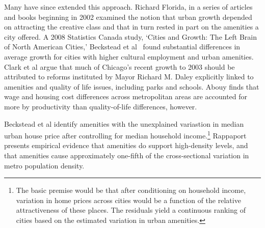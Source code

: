 Many have since extended this approach. Richard Florida, in a series of articles and books beginning in 2002 \cite{floridaCreativeClassEconomic2014, floridaEconomicGeographyTalent2002, floridaCompetingAgeTalent2005} examined the notion that urban growth depended on attracting the creative class and that in turn rested in part on the amenities a city offered. A 2008  Statistics Canada study, `Cities and Growth: The Left Brain of North American Cities,' Beckstead et al \ found substantial differences in average growth for cities with higher cultural employment and urban amenities.  Clark et al \cite{clarkAmenitiesDriveUrban2002} argue that much of Chicago's recent growth to 2003  should be attributed to reforms instituted by Mayor Richard M.  Daley explicitly linked to amenities and quality of life issues, including parks and schools. Abouy \cite{albouyWhatAreCities2016} finds that wage and housing cost differences across metropolitan areas are accounted for more by productivity than quality-of-life differences, however. 

Beckstead et al  \cite{becksteadCitiesGrowthLeft2008} identify amenities with the unexplained variastion in median urban house price after controlling for median household income.\footnote{  The basic premise would be that after conditioning on household income, variation in home prices across cities would be a function of the relative attractiveness of these places. The residuals yield a continuous ranking of cities based on the estimated variation in urban amenities.} Rappaport \cite{rappaportConsumptionAmenitiesCity2008} presents empirical evidence that amenities do support high-density levels, and that amenities cause approximately one-fifth of the cross-sectional variation in metro population density. 


  


\newpage

